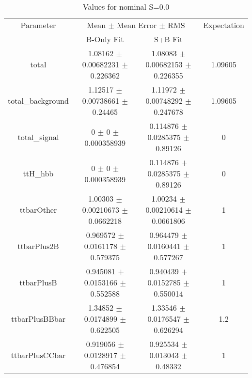 \begin{table}
\centering
\caption{Values for nominal S=0.0}
\begin{tabular}{cccc}
\toprule
Parameter & \multicolumn{2}{c}{Mean $\pm$ Mean Error $\pm$ RMS} & Expectation\\
 & B-Only Fit & S+B Fit & \\
\midrule
total & \num{1.08162} $\pm$ \num{0.00682231} $\pm$ \num{0.226362} & \num{1.08083} $\pm$ \num{0.00682153} $\pm$ \num{0.226355} & \num{1.09605}\\
total\_background & \num{1.12517} $\pm$ \num{0.00738661} $\pm$ \num{0.24465} & \num{1.11972} $\pm$ \num{0.00748292} $\pm$ \num{0.247678} & \num{1.09605}\\
total\_signal & \num{0} $\pm$ \num{0} $\pm$ \num{0.000358939} & \num{0.114876} $\pm$ \num{0.0285375} $\pm$ \num{0.89126} & \num{0}\\
ttH\_hbb & \num{0} $\pm$ \num{0} $\pm$ \num{0.000358939} & \num{0.114876} $\pm$ \num{0.0285375} $\pm$ \num{0.89126} & \num{0}\\
ttbarOther & \num{1.00303} $\pm$ \num{0.00210673} $\pm$ \num{0.0662218} & \num{1.00234} $\pm$ \num{0.00210614} $\pm$ \num{0.0661806} & \num{1}\\
ttbarPlus2B & \num{0.969572} $\pm$ \num{0.0161178} $\pm$ \num{0.579375} & \num{0.964479} $\pm$ \num{0.0160441} $\pm$ \num{0.577267} & \num{1}\\
ttbarPlusB & \num{0.945081} $\pm$ \num{0.0153166} $\pm$ \num{0.552588} & \num{0.940439} $\pm$ \num{0.0152785} $\pm$ \num{0.550014} & \num{1}\\
ttbarPlusBBbar & \num{1.34852} $\pm$ \num{0.0174899} $\pm$ \num{0.622505} & \num{1.33546} $\pm$ \num{0.0176547} $\pm$ \num{0.626294} & \num{1.2}\\
ttbarPlusCCbar & \num{0.919056} $\pm$ \num{0.0128917} $\pm$ \num{0.476854} & \num{0.925534} $\pm$ \num{0.013043} $\pm$ \num{0.48332} & \num{1}\\
\bottomrule
\end{tabular}
\end{table}